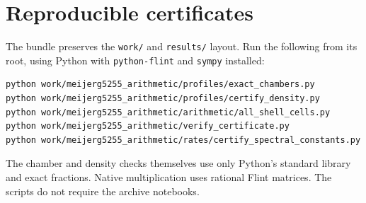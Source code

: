 \documentclass[11pt]{article}
\begin{document}
\section{Reproducible certificates}
The bundle preserves the \texttt{work/} and \texttt{results/} layout.
Run the following from its root, using Python with \texttt{python-flint}
and \texttt{sympy} installed:
\begin{verbatim}
python work/meijerg5255_arithmetic/profiles/exact_chambers.py
python work/meijerg5255_arithmetic/profiles/certify_density.py
python work/meijerg5255_arithmetic/arithmetic/all_shell_cells.py
python work/meijerg5255_arithmetic/verify_certificate.py
python work/meijerg5255_arithmetic/rates/certify_spectral_constants.py
\end{verbatim}
The chamber and density checks themselves use only Python's standard
library and exact fractions. Native multiplication uses rational Flint
matrices. The scripts do not require the archive notebooks.
\end{document}
